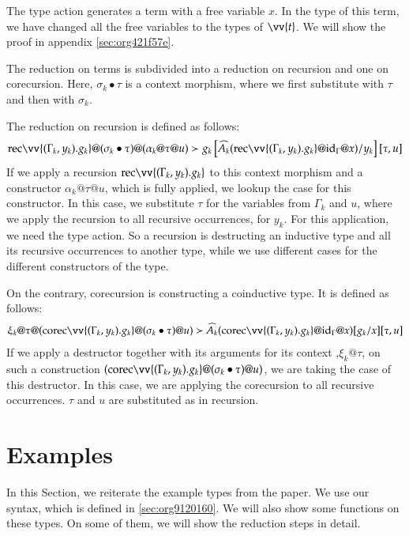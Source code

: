\documentclass[a4paper,cleardoubleempty,BCOR1cm]{scrbook}
\begin{document}
The type action generates a term with a free variable \(x\).  In the type of
this term, we have changed all the free variables to the types of \(\vv{t}\).
We will show the proof in appendix \ref{sec:org421f57e}.

The reduction on terms  is subdivided into a reduction on recursion and one
on corecursion. Here, \(\sigma_k \bullet\tau\) is a context morphism, where we
first substitute with \(\tau\) and then with \(\sigma_k\).

The reduction on recursion is defined as follows:
\begin{align*}
  \rec \vv{(\Gamma_k,y_k).g_k}@(\sigma_k\bullet\tau)@(\alpha_k@\tau@u)\succ g_k\left[ \widehat{A_k}(\rec\vv{(\Gamma_k,y_k).g_k}@\id{\Gamma}@x)/y_k \right][\tau,u]\\
\end{align*}
If we apply a recursion \(\rec \vv{(\Gamma_k,y_k).g_k}\) to this context
morphism and a constructor \(\alpha_k@\tau@u\), which is fully applied, we
lookup the case for this constructor. In this case, we substitute \(\tau\) for
the variables from \(\Gamma_k\) and \(u\), where we apply the recursion to all
recursive occurrences, for \(y_k\). For this application, we need the type
action. So a recursion is destructing an inductive type and all its recursive
occurrences to another type, while we use different cases for the different
constructors of the type.

On the contrary, corecursion is constructing a coinductive type. It is defined
as follows:
\begin{align*}
  \xi_k@\tau@(\corec \vv{(\Gamma_k,y_k).g_k}@(\sigma_k\bullet\tau)@u)\succ \widehat{A_k}(\corec\vv{(\Gamma_k,y_k).g_k}@\id{\Gamma}@x)[g_k/x] [\tau,u]
\end{align*}
If we apply a destructor together with its arguments for its context
,\(\xi_k@\tau\), on such a construction \((\corec
   \vv{(\Gamma_k,y_k).g_k}@(\sigma_k\bullet\tau)@u)\), we are taking the case of
this destructor. In this case, we are applying the corecursion to all
recursive occurrences. \(\tau\) and \(u\) are substituted as in recursion.

\chapter{Examples}
\label{sec:orgc5acffd}

In this Section, we reiterate the example types from the paper.  We use our
syntax, which is defined in \ref{sec:org9120160}.  We will also show some functions
on these types.  On some of them, we will show the reduction steps in detail.
\end{document}
